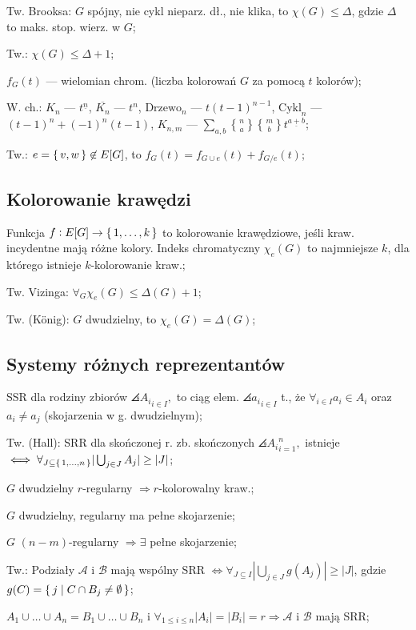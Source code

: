 \entry
Tw. Brooksa: $G$ spójny, nie cykl nieparz. dł., nie klika, to
  $\chi(G) \leq \Delta$, gdzie $\Delta$ to maks. stop. wierz. w $G$;

\entry
Tw.: $\chi(G) \leq \Delta + 1$;

\entry
$f_G(t)$ --- wielomian chrom. (liczba kolorowań $G$ za pomocą $t$ kolorów);

\entry
W. ch.:
\entry
$K_n$ --- $t^{\underline{n}}$,
\entry
$\overline{K_n}$ --- $t^n$,
\entry
$\text{Drzewo}_n$ --- $t(t-1)^{n-1}$,
\entry
$\text{Cykl}_n$ --- $(t-1)^n + (-1)^n(t-1)$,
\entry
$K_{n,m}$ --- $\sum_{a,b}{n \brace a}{m \brace b}t^{\underline{a+b}}$;

\entry
Tw.: $e = \set{v, w} \not\in E[G]$, to $f_G(t)=f_{G\cup e}(t) + f_{G/e}(t)$;

\subsection{Kolorowanie krawędzi}

\entry
Funkcja $f: E[G] \rightarrow \set{1, \dots, k}$ to kolorowanie krawędziowe,
  jeśli kraw. incydentne mają różne kolory. Indeks chromatyczny $\chi_e(G)$ to
  najmniejsze $k$, dla którego istnieje $k$-kolorowanie kraw.;

\entry
Tw. Vizinga: $\forall_G \chi_e(G) \leq \Delta(G) +1$;

\entry
Tw. (K{\"o}nig): $G$ dwudzielny, to $\chi_e(G) = \Delta(G)$;

\subsection{Systemy różnych reprezentantów}

\entry
SSR dla rodziny zbiorów $\angles{A_i}_{i\in I},$ to ciąg elem.
  $\angles{a_i}_{i\in I}$ t., że
  $\forall_{i\in I} a_i \in A_i$ oraz $a_i \neq a_j$
  (skojarzenia w g. dwudzielnym);

\entry
Tw. (Hall): SRR dla skończonej r. zb. skończonych $\angles{A_i}_{i=1}^n,$
  istnieje
  $\iff \forall_{J\subseteq\set{1,\dots,n}} |\bigcup_{j\in J}A_j| \geq |J|$;

\entry
$G$ dwudzielny $r$-regularny $\Rightarrow r$-kolorowalny kraw.;

\entry
$G$ dwudzielny, regularny ma pełne skojarzenie;

\entry
$G$ $(n-m)$-regularny $\Rightarrow \exists$ pełne skojarzenie;

\entry
Tw.: Podziały $\mathcal{A}$ i $\mathcal{B}$ mają wspólny SRR $\Leftrightarrow
  \forall_{J\subseteq I} |\bigcup_{j\in J}g(A_j)| \geq |J|$, gdzie
  $g(C) = \set{j | C \cap B_j \neq \emptyset}$;

\entry
$A_1 \cup \dots \cup A_n = B_1 \cup \dots \cup B_n$ i
  $\forall_{1 \leq i \leq n}|A_i| = |B_i| =r \Rightarrow \mathcal{A}$ i
  $\mathcal{B}$ mają SRR;
